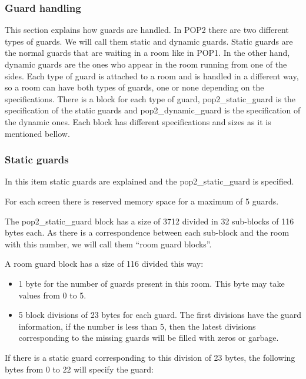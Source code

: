 \documentclass{article}
\begin{document}
\subsubsection{Guard handling} %
 This section explains how guards are handled. In POP2 there are two
 different types of guards. We will call them static and dynamic guards.
 Static guards are the normal guards that are waiting in a room like in
 POP1. In the other hand, dynamic guards are the ones who appear in the
 room running from one of the sides. Each type of guard is attached to a
 room and is handled in a different way, so a room can have both types of
 guards, one or none depending on the specifications. There is a block for
 each type of guard, pop2\_static\_guard is the specification of the static
 guards and pop2\_dynamic\_guard is the specification of the dynamic ones.
 Each block has different specifications and sizes as it is mentioned
 bellow.
 
\subsubsection{Static guards} %
 
 In this item static guards are explained and the pop2\_static\_guard is
 specified.
 
 For each screen there is reserved memory space for a maximum of 5 guards.
 
 The pop2\_static\_guard block has a size of 3712 divided in 32 sub-blocks of
 116 bytes each. As there is a correspondence between each sub-block and
 the room with this number, we will call them ``room guard blocks''.
 
 A room guard block has a size of 116 divided this way:
\begin{itemize}
\item 1 byte for the number of guards present in this room.
   This byte may take values from 0 to 5.
\item 5 block divisions of 23 bytes for each guard.
   The first divisions have the guard information, if the number is less
   than 5, then the latest divisions corresponding to the missing guards
   will be filled with zeros or garbage.
\end{itemize} 

 If there is a static guard corresponding to this division of 23 bytes,
 the following bytes from 0 to 22 will specify the guard:
 
\end{document}
